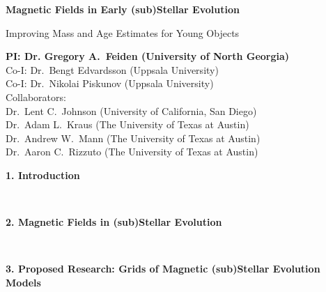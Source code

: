 \documentclass[12pt,letter]{article}
\begin{document}
\thispagestyle{empty}


\begin{center}
	{\bf {\Large Magnetic Fields in Early (sub)Stellar Evolution}
	
	{\large Improving Mass and Age Estimates for Young Objects}}
\end{center}

\begin{center}
	{\bf PI: Dr. Gregory A.~Feiden (University of North Georgia)} \\
	Co-I: Dr.~Bengt Edvardsson (Uppsala University) \\
	Co-I: Dr.~Nikolai Piskunov (Uppsala University) \\
	Collaborators: \\
	Dr.~Lent C.~Johnson (University of California, San Diego) \\
	Dr.~Adam L.~Kraus (The University of Texas at Austin) \\
	Dr.~Andrew W.~Mann (The University of Texas at Austin) \\
	Dr.~Aaron C.~Rizzuto (The University of Texas at Austin) \\
\end{center}

\tableofcontents

\clearpage

{\bf\large 1. Introduction}  \\

\clearpage

{\bf\large 2. Magnetic Fields in (sub)Stellar Evolution}  \\

\clearpage

{\bf\large 3. Proposed Research: Grids of Magnetic (sub)Stellar Evolution Models}  \\
\end{document}
